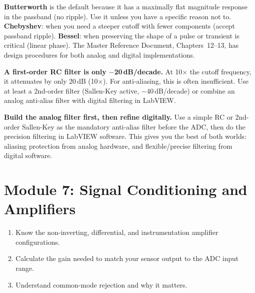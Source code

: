 \documentclass[11pt,letterpaper]{article}
\begin{document}
\begin{faqbox}
\textbf{Butterworth} is the default because it has a maximally flat magnitude response in the passband (no ripple). Use it unless you have a specific reason not to. \textbf{Chebyshev}: when you need a steeper cutoff with fewer components (accept passband ripple). \textbf{Bessel}: when preserving the shape of a pulse or transient is critical (linear phase). The Master Reference Document, Chapters~12--13, has design procedures for both analog and digital implementations.
\end{faqbox}

\begin{warnbox}
\textbf{A first-order RC filter is only $-$20\,dB/decade.} At 10$\times$ the cutoff frequency, it attenuates by only 20\,dB (10$\times$). For anti-aliasing, this is often insufficient. Use at least a 2nd-order filter (Sallen-Key active, $-$40\,dB/decade) or combine an analog anti-alias filter with digital filtering in LabVIEW.
\end{warnbox}

\begin{protip}
\textbf{Build the analog filter first, then refine digitally.} Use a simple RC or 2nd-order Sallen-Key as the mandatory anti-alias filter before the ADC, then do the precision filtering in LabVIEW software. This gives you the best of both worlds: aliasing protection from analog hardware, and flexible/precise filtering from digital software.
\end{protip}

\section{Module 7: Signal Conditioning and Amplifiers}

\begin{priorities}
\begin{enumerate}[leftmargin=*, itemsep=1pt, topsep=0pt]
    \item Know the non-inverting, differential, and instrumentation amplifier configurations.
    \item Calculate the gain needed to match your sensor output to the ADC input range.
    \item Understand common-mode rejection and why it matters.
\end{enumerate}
\end{priorities}
\end{document}

